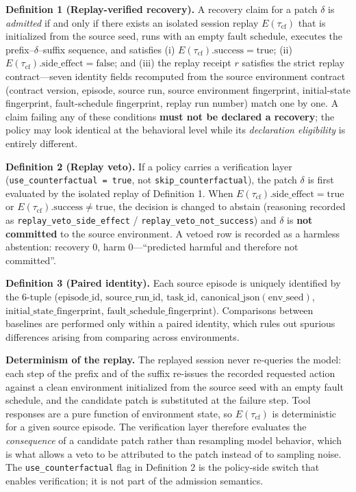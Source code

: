 \documentclass[10pt]{article}
\begin{document}
\textbf{Definition 1 (Replay-verified recovery).} A recovery claim for a patch $\delta$ is \emph{admitted} if and only if there exists an isolated session replay $E(\tau_{\text{cf}})$ that is initialized from the source seed, runs with an empty fault schedule, executes the prefix--$\delta$--suffix sequence, and satisfies (i) $E(\tau_{\text{cf}}).\text{success} = \text{true}$; (ii) $E(\tau_{\text{cf}}).\text{side\_effect} = \text{false}$; and (iii) the replay receipt $r$ satisfies the strict replay contract---seven identity fields recomputed from the source environment contract (contract version, episode, source run, source environment fingerprint, initial-state fingerprint, fault-schedule fingerprint, replay run number) match one by one. A claim failing any of these conditions \textbf{must not be declared a recovery}; the policy may look identical at the behavioral level while its \emph{declaration eligibility} is entirely different.

\textbf{Definition 2 (Replay veto).} If a policy carries a verification layer (\texttt{use\_counterfactual = true}, not \texttt{skip\_counterfactual}), the patch $\delta$ is first evaluated by the isolated replay of Definition 1. When $E(\tau_{\text{cf}}).\text{side\_effect} = \text{true}$ or $E(\tau_{\text{cf}}).\text{success} \neq \text{true}$, the decision is changed to abstain (reasoning recorded as \texttt{replay\_veto\_side\_effect} / \texttt{replay\_veto\_not\_success}) and $\delta$ is \textbf{not committed} to the source environment. A vetoed row is recorded as a harmless abstention: recovery 0, harm 0---``predicted harmful and therefore not committed''.

\textbf{Definition 3 (Paired identity).} Each source episode is uniquely identified by the 6-tuple ($\text{episode\_id}$, $\text{source\_run\_id}$, $\text{task\_id}$, $\text{canonical\_json}(\text{env\_seed})$, $\text{initial\_state\_fingerprint}$, $\text{fault\_schedule\_fingerprint}$). Comparisons between baselines are performed only within a paired identity, which rules out spurious differences arising from comparing across environments.

\textbf{Determinism of the replay.} The replayed session never re-queries the model: each step of the prefix and of the suffix re-issues the recorded requested action against a clean environment initialized from the source seed with an empty fault schedule, and the candidate patch is substituted at the failure step. Tool responses are a pure function of environment state, so $E(\tau_{\text{cf}})$ is deterministic for a given source episode. The verification layer therefore evaluates the \emph{consequence} of a candidate patch rather than resampling model behavior, which is what allows a veto to be attributed to the patch instead of to sampling noise. The \texttt{use\_counterfactual} flag in Definition 2 is the policy-side switch that enables verification; it is not part of the admission semantics.
\end{document}

